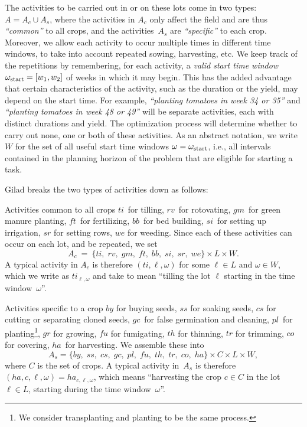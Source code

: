\documentclass[11pt,reqno]{amsart}
\numberwithin{equation}{section}
\begin{document}
The activities to be carried out in or on these lots come in two types: $A=A_c\cup A_s$,
where the activities in $A_c$ only affect the field and are thus \emph{``common''} to all
crops, and the activities~$A_s$ are \emph{``specific''} to each crop. Moreover, we allow
each activity to occur multiple times in different time windows, to take into account
repeated sowing, harvesting, etc. We keep track of the repetitions by remembering, for
each activity, a \emph{valid start time window} $\omega_{\rm start} = [w_1, w_2]$ of weeks
in which it may begin. This has the added advantage that certain characteristics of the
activity, such as the duration or the yield, may depend on the start time. For example,
\emph{``planting tomatoes in week 34 or 35''} and \emph{``planting tomatoes in week 48 or
  49''} will be separate activities, each with distinct durations and yield. The
optimization process will determine whether to carry out none, one or both of these
activities. As an abstract notation, we write~$W$ for the set of all useful start time
windows $\omega = \omega_{\rm start}$, i.e., all intervals contained in the planning
horizon of the problem that are eligible for starting a task.

\smallskip
Gilad breaks the two types of activities down as follows:

\begin{mydesc}
\item[Activities common to all crops] $ti$~for tilling, $rv$~for rotovating, $gm$~for
  green manure planting, $f\!t$~for fertilizing, $bb$~for bed building, $si$~for setting
  up irrigation, $sr$ for setting rows, $we$ for weeding. Since each of these activities
  can occur on each lot, and be repeated, we set
  \[
     A_c 
     \ = \
     \{ ti,\;rv,\;gm,\;f\!t,\;bb,\;si,\;sr,\;we\} \times L \times W.
  \]
  A typical activity in $A_c$ is therefore $(ti,\ell, \omega)$ for some $\ell\in L$ and
  $\omega\in W$, which we write as $ti_{\ell, \omega}$ and take to mean ``tilling the lot
  $\ell$ starting in the time window~$\omega$''.


\item[Activities specific to a crop] $by$ for buying seeds, $ss$ for soaking seeds, $cs$
  for cutting or separating cloned seeds, $gc$~for false germination and cleaning,
  $pl$~for planting\footnote{We consider transplanting and planting to be the same
    process.}, $gr$ for growing, $f\!u$ for fumigating, $th$ for thinning, $tr$ for
  trimming, $co$ for covering, $ha$~for harvesting. We assemble these into
  \[
     A_s = \{ by,\;ss,\;cs,\;gc,\;pl,\;f\!u,\;th,\;tr,\;co,\;ha\}
     \times C \times L \times W,
  \]
  where $C$ is the set of crops. A typical activity in~$A_s$ is therefore $(ha,c,\ell,
  \omega)=ha_{c,\ell, \omega}$, which means ``harvesting the crop $c\in C$ in the lot
  $\ell\in L$, starting during the time window~$\omega$''.
\end{mydesc}
\end{document}
